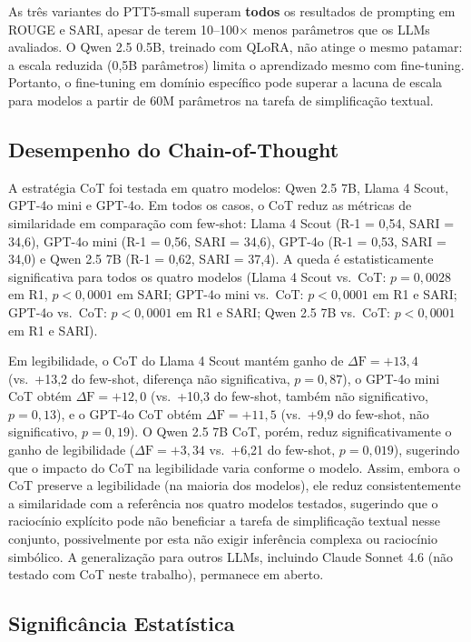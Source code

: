 \documentclass[a4paper, twocolumn, 11pt, twoside]{article}
\begin{document}
As três variantes do PTT5-small superam \textbf{todos} os
resultados de prompting em ROUGE e SARI, apesar de terem 10--100$\times$
menos parâmetros que os LLMs avaliados. O Qwen 2.5 0.5B, treinado com
QLoRA, não atinge o mesmo patamar: a escala reduzida
(0,5B parâmetros) limita o aprendizado mesmo com fine-tuning.
Portanto, o fine-tuning em domínio específico pode superar a lacuna
de escala para modelos a partir de 60M parâmetros na tarefa de
simplificação textual.

\subsection{Desempenho do Chain-of-Thought}

A estratégia CoT foi testada em quatro modelos: Qwen 2.5 7B, Llama 4
Scout, GPT-4o mini e GPT-4o. Em todos os casos, o CoT reduz as métricas
de similaridade em comparação com few-shot: Llama 4 Scout
(R-1 = 0,54, SARI = 34,6), GPT-4o mini (R-1 = 0,56, SARI = 34,6),
GPT-4o (R-1 = 0,53, SARI = 34,0) e
Qwen 2.5 7B (R-1 = 0,62, SARI = 37,4). A queda é estatisticamente
significativa para todos os quatro modelos (Llama 4 Scout vs.\
CoT: $p=0,0028$ em R1, $p<0,0001$ em SARI; GPT-4o mini vs.\
CoT: $p<0,0001$ em R1 e SARI; GPT-4o vs.\
CoT: $p<0,0001$ em R1 e SARI; Qwen 2.5 7B vs.\
CoT: $p<0,0001$ em R1 e SARI).

Em legibilidade, o CoT do Llama 4 Scout mantém ganho de
$\Delta \mathrm{F} = +13,4$ (vs.\ +13,2 do few-shot, diferença não
significativa, $p=0,87$), o GPT-4o mini CoT obtém
$\Delta \mathrm{F} = +12,0$ (vs.\ +10,3 do few-shot, também não
significativo, $p=0,13$), e o GPT-4o CoT obtém
$\Delta \mathrm{F} = +11,5$ (vs.\ +9,9 do few-shot, não
significativo, $p=0,19$). O Qwen 2.5 7B CoT, porém, reduz
significativamente o ganho de legibilidade
($\Delta \mathrm{F} = +3,34$ vs.\ +6,21 do few-shot, $p=0,019$),
sugerindo que o impacto do CoT na legibilidade varia conforme o
modelo. Assim, embora o CoT preserve a legibilidade (na maioria
dos modelos), ele reduz consistentemente a similaridade com a
referência nos quatro modelos testados, sugerindo que o
raciocínio explícito pode não beneficiar a tarefa de
simplificação textual nesse conjunto, possivelmente por esta
não exigir inferência complexa ou raciocínio simbólico. A
generalização para outros LLMs, incluindo Claude Sonnet 4.6
(não testado com CoT neste trabalho), permanece em aberto.

\subsection{Significância Estatística}
\end{document}
